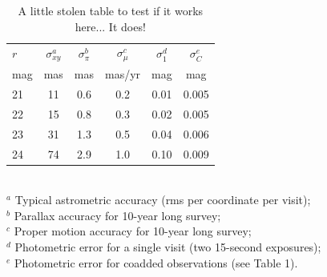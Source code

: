 \begin{table}[t!]
\caption{A little stolen table to test if it works here... It does! }
\vskip 0.05in
\begin{tabular}{|l|c|c|c|c|c|}
\hline  
    $r$   &  $\sigma^a_{xy} $  & $\sigma^b_\pi$  &   $\sigma^c_\mu$   &  $\sigma^d_1$  &  $\sigma^e_C$  \\
    mag &       mas            &      mas  & mas/yr &   mag   &    mag  \\
\hline  
       21 &  11  &  0.6  &  0.2   &   0.01  &   0.005 \\
       22 &  15  &  0.8  &  0.3   &   0.02  &   0.005 \\
       23 &  31  &  1.3  &  0.5   &   0.04  &   0.006 \\
       24 &  74  &  2.9  &  1.0   &   0.10  &   0.009 \\
\hline                         
\end{tabular}
\\ \vskip 0.05in
  $^a$ Typical astrometric accuracy (rms per coordinate per visit); \\
  $^b$ Parallax accuracy for 10-year long survey; \\
  $^c$ Proper motion accuracy for 10-year long survey; \\
  $^d$ Photometric error for a single visit (two 15-second exposures); \\
  $^e$ Photometric error for coadded observations (see Table 1). \\
\end{table}
